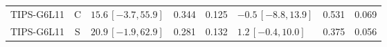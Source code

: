 \begin{longtable}{lcp{37mm}rrp{37mm}rr}
TIPS-G6L11 & C & \(15.6\,[-3.7,55.9]\) & 0.344 & 0.125 & \(-0.5\,[-8.8,13.9]\) & 0.531 & 0.069\\
TIPS-G6L11 & S & \(20.9\,[-1.9,62.9]\) & 0.281 & 0.132 & \(1.2\,[-0.4,10.0]\) & 0.375 & 0.056\\

\end{longtable}
